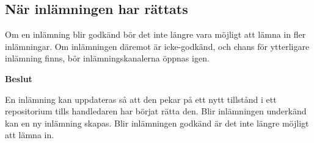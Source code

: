 \subsection{När inlämningen har rättats}
Om en inlämning blir godkänd bör det inte längre vara möjligt att lämna in fler inlämningar. Om inlämningen däremot är icke-godkänd, och chans för ytterligare inlämning finns, bör inlämningskanalerna öppnas igen.

\begin{flushright}

  \textbf{Beslut}
  
  \nopagebreak
  
  En inlämning kan uppdateras så att den pekar på ett nytt tillstånd i ett repositorium tills handledaren har börjat rätta den. Blir inlämningen underkänd kan en ny inlämning skapas. Blir inlämningen godkänd är det inte längre möjligt att lämna in.
\end{flushright}
